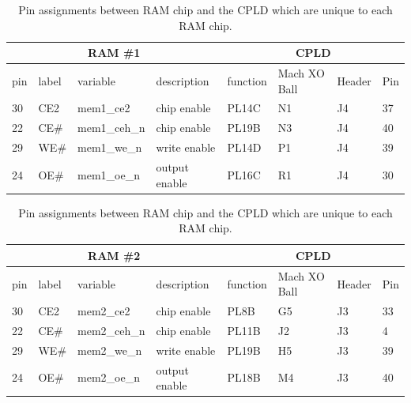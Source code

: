 \documentclass{article}
\begin{document}
\begin{table}
\center

\begin{tabular}{|l|l|l|l|l|l|l|l|}
    \hline
	\multicolumn{4}{|c|}{\textbf{RAM \#1}} & \multicolumn{4}{|c|}{\textbf{CPLD}} \\
	\hline
    pin & label & variable & description &  function & Mach XO Ball & Header & Pin \\
    \hline
    30 & CE2 & mem1\_ce2 & chip enable & PL14C & N1 & J4 & 37 \\
	\hline
    22 & CE\# & mem1\_ceh\_n & chip enable & PL19B & N3 & J4 & 40 \\
	\hline
    29 & WE\# & mem1\_we\_n & write enable & PL14D & P1 & J4 & 39 \\
	\hline
    24 & OE\# & mem1\_oe\_n & output enable & PL16C & R1 & J4 & 30 \\
	\hline
\end{tabular}

\vspace{5mm}  

\begin{tabular}{|l|l|l|l|l|l|l|l|}
    \hline
	\multicolumn{4}{|c|}{\textbf{RAM \#2}} & \multicolumn{4}{|c|}{\textbf{CPLD}} \\
	\hline
    pin & label & variable & description &  function & Mach XO Ball & Header & Pin \\
    \hline
    30 & CE2 & mem2\_ce2 & chip enable & PL8B & G5 & J3 & 33 \\
	\hline
    22 & CE\# & mem2\_ceh\_n & chip enable & PL11B & J2 & J3 & 4 \\
	\hline
    29 & WE\# & mem2\_we\_n & write enable & PL19B & H5 & J3 & 39 \\
	\hline
    24 & OE\# & mem2\_oe\_n & output enable & PL18B & M4 & J3 & 40 \\
	\hline
\end{tabular}

\caption{Pin assignments between RAM chip and the CPLD
which are unique to each RAM chip.}
\label{tbl:rampinsuniq}
\end{table}
\end{document}
